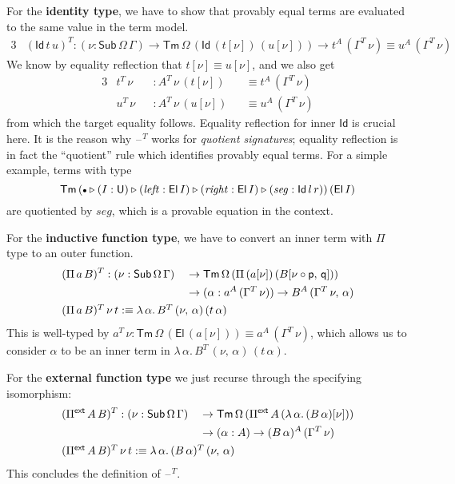 \documentclass[12pt,a4paper,twoside,openany]{book}
\theoremstyle{remark}
\theoremstyle{definition}
\theoremstyle{theorem}
\newcommand{\mi}[1]{\mathit{#1}}
\newcommand{\Sub}{\mathsf{Sub}}
\newcommand{\Tm}{\mathsf{Tm}}
\newcommand{\U}{\mathsf{U}}
\newcommand{\El}{\mathsf{El}}
\newcommand{\Id}{\mathsf{Id}}
\newcommand{\blank}{\mathord{\hspace{1pt}\text{--}\hspace{1pt}}}
\newcommand{\ext}{\triangleright}
\newcommand{\emptycon}{\scaleobj{.75}\bullet}
\newcommand{\Pie}{\Pi^{\mathsf{ext}}}
\newcommand{\p}{\mathsf{p}}
\newcommand{\q}{\mathsf{q}}
\newcommand{\defn}{:\equiv}
\begin{document}
For the \textbf{identity type}, we have to show that provably equal terms are evaluated
to the same value in the term model.
\begin{alignat*}{3}
  &(\Id\,t\,u)^T : (\nu : \Sub\,\Omega\,\Gamma)
    \to \Tm\,\Omega\,(\Id\,(t[\nu])\,(u[\nu])) \to t^A\,(\Gamma^T\,\nu) \equiv u^A\,(\Gamma^T\,\nu)
\end{alignat*}
We know by equality reflection that $t[\nu] \equiv u[\nu]$, and
we also get
\begin{alignat*}{3}
  &t^T\,\nu &&: A^T\,\nu\,(t[\nu]) &&\equiv t^A\,(\Gamma^T\,\nu)\\
  &u^T\,\nu &&: A^T\,\nu\,(u[\nu]) &&\equiv u^A\,(\Gamma^T\,\nu)
\end{alignat*}
from which the target equality follows. Equality reflection for inner $\Id$ is
crucial here. It is the reason why $\blank^T$ works for \emph{quotient
signatures}; equality reflection is in fact the ``quotient'' rule which
identifies provably equal terms. For a simple example, terms with type
\[
  \Tm\,
  (\emptycon \ext (I : \U) \ext (\mi{left} : \El\,I) \ext (\mi{right} : \El\,I) \ext (\mi{seg} : \Id\,l\,r))\,
  (\El\,I)
\]
are quotiented by $\mi{seg}$, which is a provable equation in the context.

For the \textbf{inductive function type}, we have to convert an inner term with
$\Pi$ type to an outer function.
\begin{alignat*}{3}
  &(\Pi\,a\,B)^T : (\nu : \Sub\,\Omega\,\Gamma)
                 &&\to \Tm\,\Omega\,(\Pi\,(a[\nu])\,(B[\nu\circ\p,\,\q]))\\
  &              &&\to (\alpha : a^A\,(\Gamma^T\,\nu)) \to B^A\,(\Gamma^T\,\nu,\,\alpha)\\
  &\rlap{$(\Pi\,a\,B)^T\,\nu\,t \defn \lambda\,\alpha.\,B^T\,(\nu,\,\alpha)\,(t\,\alpha)$}
\end{alignat*}
This is well-typed by $a^T\,\nu :
\Tm\,\Omega\,(\El\,(a[\nu])) \equiv
a^A\,(\Gamma^T\,\nu)$, which allows us to consider $\alpha$ to be an inner term
in $\lambda\,\alpha.\,B^T\,(\nu,\,\alpha)\,(t\,\alpha)$.

For the \textbf{external function type} we just recurse through the specifying
isomorphism:
\begin{alignat*}{3}
  &(\Pie\,A\,B)^T : (\nu : \Sub\,\Omega\,\Gamma)
                 &&\to \Tm\,\Omega\,(\Pie\,A\,(\lambda\,\alpha.\,(B\,\alpha)[\nu]))\\
  &              &&\to (\alpha : A) \to (B\,\alpha)^A\,(\Gamma^T\,\nu)\\
  &\rlap{$(\Pie\,A\,B)^T\,\nu\,t \defn \lambda\,\alpha.\,(B\,\alpha)^T\,(\nu,\,\alpha)$}
\end{alignat*}
This concludes the definition of $\blank^T$.
\end{document}
